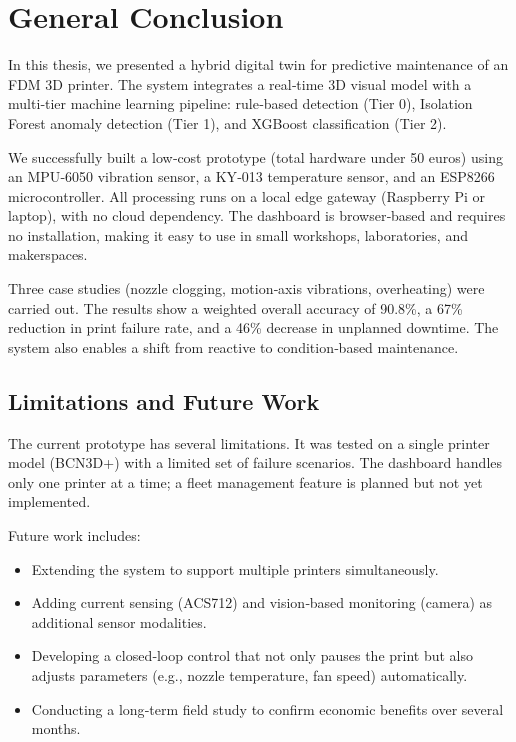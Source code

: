 \chapter*{General Conclusion}
\label{chap:conclusion}

In this thesis, we presented a hybrid digital twin for predictive maintenance of an FDM 3D printer. The system integrates a real‑time 3D visual model with a multi‑tier machine learning pipeline: rule‑based detection (Tier 0), Isolation Forest anomaly detection (Tier 1), and XGBoost classification (Tier 2).

We successfully built a low‑cost prototype (total hardware under 50 euros) using an MPU‑6050 vibration sensor, a KY‑013 temperature sensor, and an ESP8266 microcontroller. All processing runs on a local edge gateway (Raspberry Pi or laptop), with no cloud dependency. The dashboard is browser‑based and requires no installation, making it easy to use in small workshops, laboratories, and makerspaces.

Three case studies (nozzle clogging, motion‑axis vibrations, overheating) were carried out. The results show a weighted overall accuracy of 90.8\%, a 67\% reduction in print failure rate, and a 46\% decrease in unplanned downtime. The system also enables a shift from reactive to condition‑based maintenance.

\section*{Limitations and Future Work}
The current prototype has several limitations. It was tested on a single printer model (BCN3D+) with a limited set of failure scenarios. The dashboard handles only one printer at a time; a fleet management feature is planned but not yet implemented.

Future work includes:
\begin{itemize}
    \item Extending the system to support multiple printers simultaneously.
    \item Adding current sensing (ACS712) and vision‑based monitoring (camera) as additional sensor modalities.
    \item Developing a closed‑loop control that not only pauses the print but also adjusts parameters (e.g., nozzle temperature, fan speed) automatically.
    \item Conducting a long‑term field study to confirm economic benefits over several months.
\end{itemize}